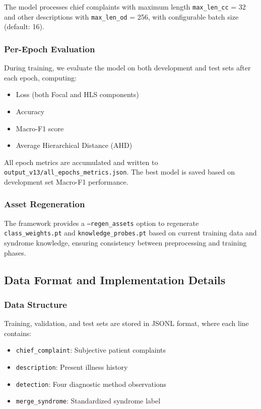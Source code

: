 \documentclass{article}
\begin{document}
The model processes chief complaints with maximum length \texttt{max\_len\_cc} = 32 and other descriptions with \texttt{max\_len\_od} = 256, with configurable batch size (default: 16).

\subsubsection{Per-Epoch Evaluation}

During training, we evaluate the model on both development and test sets after each epoch, computing:
\begin{itemize}
    \item Loss (both Focal and HLS components)
    \item Accuracy
    \item Macro-F1 score
    \item Average Hierarchical Distance (AHD)
\end{itemize}

All epoch metrics are accumulated and written to \texttt{output\_v13/all\_epochs\_metrics.json}. The best model is saved based on development set Macro-F1 performance.

\subsubsection{Asset Regeneration}

The framework provides a \texttt{--regen\_assets} option to regenerate \texttt{class\_weights.pt} and \texttt{knowledge\_probes.pt} based on current training data and syndrome knowledge, ensuring consistency between preprocessing and training phases.

\subsection{Data Format and Implementation Details}

\subsubsection{Data Structure}

Training, validation, and test sets are stored in JSONL format, where each line contains:
\begin{itemize}
    \item \texttt{chief\_complaint}: Subjective patient complaints
    \item \texttt{description}: Present illness history
    \item \texttt{detection}: Four diagnostic method observations
    \item \texttt{merge\_syndrome}: Standardized syndrome label
\end{itemize}
\end{document}
